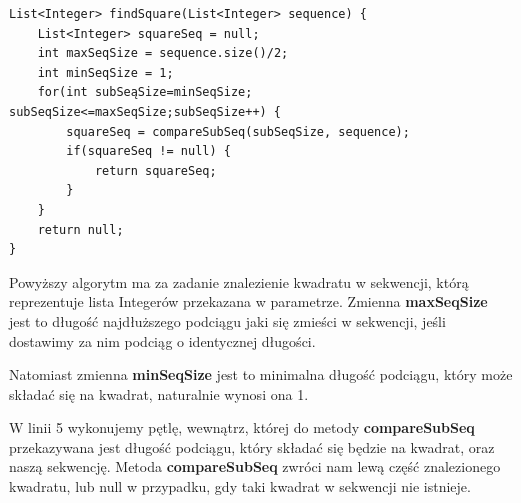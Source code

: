 \documentclass[document]{xmgr}
\begin{document}




\begin{lstlisting}[frame=single]
List<Integer> findSquare(List<Integer> sequence) {
	List<Integer> squareSeq = null;
	int maxSeqSize = sequence.size()/2;
	int minSeqSize = 1;
	for(int subSeąSize=minSeqSize; subSeqSize<=maxSeqSize;subSeqSize++) {
		squareSeq = compareSubSeq(subSeqSize, sequence);
		if(squareSeq != null) {
			return squareSeq;
		}
	}
	return null;
}
\end{lstlisting}

Powyższy algorytm ma za zadanie znalezienie kwadratu w sekwencji, którą reprezentuje lista Integerów przekazana w parametrze. Zmienna \textbf{maxSeqSize} jest to długość najdłuższego podciągu jaki się zmieści w sekwencji, jeśli dostawimy za nim podciąg o identycznej długości.

Natomiast zmienna \textbf{minSeqSize} jest to minimalna długość podciągu, który może składać się na kwadrat, naturalnie wynosi ona 1. 

W linii 5 wykonujemy pętlę, wewnątrz, której do metody \textbf{compareSubSeq} przekazywana jest długość podciągu, który składać się będzie na kwadrat, oraz naszą sekwencję. Metoda \textbf{compareSubSeq} zwróci nam lewą część znalezionego kwadratu, lub null w przypadku, gdy taki kwadrat w sekwencji nie istnieje.
\end{document}
